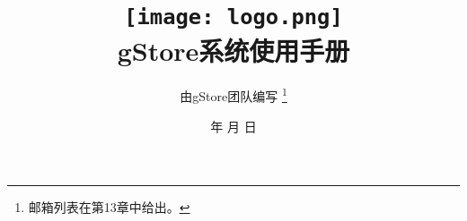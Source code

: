\documentclass[titlepage, a4paper, 12pt]{article}
\begin{document}


\renewcommand{\contentsname}{目录}
\renewcommand{\listfigurename}{图目录}
\renewcommand{\listtablename}{表目录}
\renewcommand{\partname}{第\thepart部}
\renewcommand{\figurename}{图}
\renewcommand{\tablename}{表}
\renewcommand{\appendixname}{附录}
\renewcommand{\indexname}{索引}
\renewcommand{\abstractname}{摘要}
\renewcommand{\refname}{参考文献}
\renewcommand{\equationautorefname}{公式}
\renewcommand{\footnoteautorefname}{脚注}
\renewcommand{\itemautorefname}{项}
\renewcommand{\figureautorefname}{图}
\renewcommand{\tableautorefname}{表}
\renewcommand{\theoremautorefname}{定理}
\renewcommand{\today}{\number\year 年 \number\month 月 \number\day 日}	


\title{\texttt{[image: logo.png]} \\
	gStore系统使用手册}
\author{由gStore团队编写 \footnote{邮箱列表在第13章中给出。}}
\date{\today}
\maketitle

\setcounter{tocdepth}{4}
\renewcommand{\contentsname}{目\hspace{2em}录} %
\begin{center}  %
\tableofcontents
\end{center}
\clearpage
\end{document}
